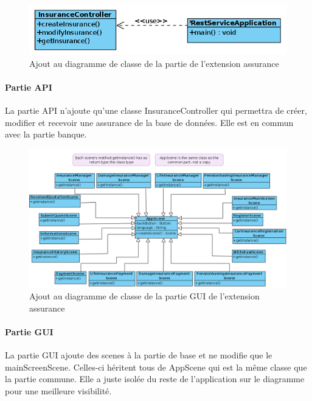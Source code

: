 \documentclass[]{article}
\begin{document}
\begin{figure}[ht]
\centering
\includegraphics[scale=0.3]{img/APIAssurance.png}
\caption{Ajout au diagramme de classe de la partie de l'extension assurance}
\label{fig2}
\end{figure}

\paragraph{Partie API} La partie API n’ajoute qu’une classe InsuranceController qui permettra de créer, modifier et recevoir une assurance de la base de données. Elle est en commun avec la partie banque.

\begin{figure}[ht]
\centering
\includegraphics[scale=0.3]{img/GUIAssurance.png}
\caption{Ajout au diagramme de classe de la partie GUI de l'extension assurance}
\label{fig3}
\end{figure}

\paragraph{Partie GUI} La partie GUI ajoute des scenes à la partie de base et ne modifie que le mainScreenScene. Celles-ci héritent tous de AppScene qui est la même classe que la partie commune. Elle a juste isolée du reste de l’application sur le diagramme pour une meilleure visibilité.
\end{document}

